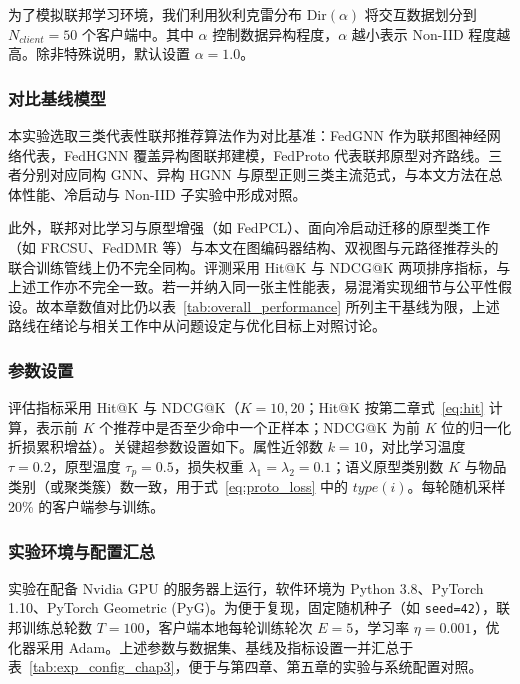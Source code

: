 为了模拟联邦学习环境，我们利用狄利克雷分布 $\text{Dir}(\alpha)$ 将交互数据划分到 $N_{client}=50$ 个客户端中。其中 $\alpha$ 控制数据异构程度，$\alpha$ 越小表示 Non-IID 程度越高。除非特殊说明，默认设置 $\alpha=1.0$。

\subsubsection{对比基线模型}
本实验选取三类代表性联邦推荐算法作为对比基准：FedGNN\cite{wu2021fedgnn} 作为联邦图神经网络代表，FedHGNN\cite{yan2024fedhgnn} 覆盖异构图联邦建模，FedProto\cite{tan2022fedproto} 代表联邦原型对齐路线。三者分别对应同构 GNN、异构 HGNN 与原型正则三类主流范式，与本文方法在总体性能、冷启动与 Non-IID 子实验中形成对照。

此外，联邦对比学习与原型增强（如 FedPCL\cite{wang2025fedpcl}）、面向冷启动迁移的原型类工作（如 FRCSU\cite{li2025frcsu}、FedDMR\cite{feddmr2025} 等）与本文在图编码器结构、双视图与元路径推荐头的联合训练管线上仍不完全同构。评测采用 Hit@K 与 NDCG@K 两项排序指标，与上述工作亦不完全一致。若一并纳入同一张主性能表，易混淆实现细节与公平性假设。故本章数值对比仍以表~\ref{tab:overall_performance} 所列主干基线为限，上述路线在绪论与相关工作中从问题设定与优化目标上对照讨论。

\subsubsection{参数设置}
评估指标采用 Hit@K 与 NDCG@K（$K=10, 20$；Hit@K 按第二章式~\eqref{eq:hit} 计算，表示前 $K$ 个推荐中是否至少命中一个正样本；NDCG@K 为前 $K$ 位的归一化折损累积增益）。关键超参数设置如下。属性近邻数 $k=10$，对比学习温度 $\tau=0.2$，原型温度 $\tau_p=0.5$，损失权重 $\lambda_1=\lambda_2=0.1$；语义原型类别数 $K$ 与物品类别（或聚类簇）数一致，用于式~\eqref{eq:proto_loss} 中的 $type(i)$。每轮随机采样 20\% 的客户端参与训练。

\subsubsection{实验环境与配置汇总}
实验在配备 Nvidia GPU 的服务器上运行，软件环境为 Python 3.8、PyTorch 1.10、PyTorch Geometric (PyG)。为便于复现，固定随机种子（如 \texttt{seed=42}），联邦训练总轮数 $T=100$，客户端本地每轮训练轮次 $E=5$，学习率 $\eta=0.001$，优化器采用 Adam。上述参数与数据集、基线及指标设置一并汇总于表~\ref{tab:exp_config_chap3}，便于与第四章、第五章的实验与系统配置对照。

